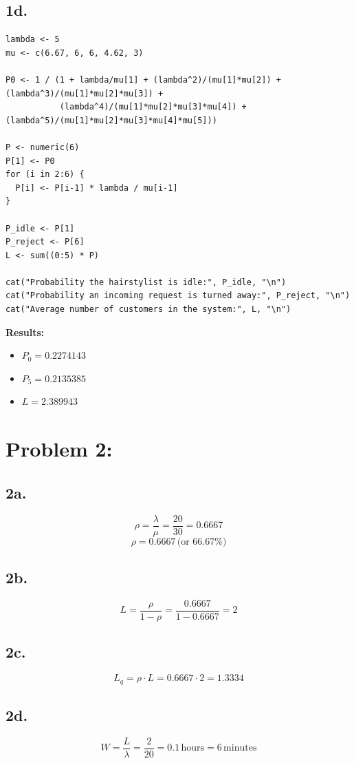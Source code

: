 \documentclass[12pt]{article}
\begin{document}
\subsection*{1d.}

\begin{verbatim}
lambda <- 5
mu <- c(6.67, 6, 6, 4.62, 3)

P0 <- 1 / (1 + lambda/mu[1] + (lambda^2)/(mu[1]*mu[2]) + (lambda^3)/(mu[1]*mu[2]*mu[3]) + 
           (lambda^4)/(mu[1]*mu[2]*mu[3]*mu[4]) + (lambda^5)/(mu[1]*mu[2]*mu[3]*mu[4]*mu[5]))

P <- numeric(6)
P[1] <- P0
for (i in 2:6) {
  P[i] <- P[i-1] * lambda / mu[i-1]
}

P_idle <- P[1]         
P_reject <- P[6]       
L <- sum((0:5) * P)    

cat("Probability the hairstylist is idle:", P_idle, "\n")
cat("Probability an incoming request is turned away:", P_reject, "\n")
cat("Average number of customers in the system:", L, "\n")
\end{verbatim}

\textbf{Results:}
\begin{itemize}
    \item \(P_0 = \text{0.2274143 }\)
    \item \(P_5 = \text{0.2135385}\)
    \item \(L = \text{2.389943}\)
\end{itemize}

\section*{Problem 2:}

\subsection*{2a.}
\[
\rho = \frac{\lambda}{\mu} = \frac{20}{30} = 0.6667
\]
\[
\rho = 0.6667 \, \text{(or 66.67\%)}
\]

\subsection*{2b.}
\[
L = \frac{\rho}{1 - \rho} = \frac{0.6667}{1 - 0.6667} = 2
\]

\subsection*{2c.}
\[
L_q = \rho \cdot L = 0.6667 \cdot 2 = 1.3334
\]

\subsection*{2d.}
\[
W = \frac{L}{\lambda} = \frac{2}{20} = 0.1 \, \text{hours} = 6 \, \text{minutes}
\]
\end{document}
